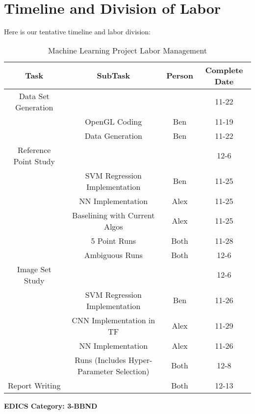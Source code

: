 \documentclass[journal]{IEEEtran}
\begin{document}
\section{Timeline and Division of Labor}

Here is our tentative timeline and labor division:

\begin{table}
\caption{Machine Learning Project Labor Management}
\label{SomeTable}
\centering
\begin{tabular}{|c|c|c|c|}
\hline
Task & SubTask & Person & Complete Date\\
\hline
Data Set Generation &  & & 11-22\\
& OpenGL Coding & Ben & 11-19\\
& Data Generation & Ben & 11-22\\
Reference Point Study & & & 12-6\\
& SVM Regression Implementation & Ben & 11-25\\
& NN Implementation & Alex & 11-25\\
& Baselining with Current Algos & Alex & 11-25\\
& 5 Point Runs & Both & 11-28\\
& Ambiguous Runs & Both & 12-6\\
Image Set Study & & & 12-6\\
& SVM Regression Implementation & Ben & 11-26\\
& CNN Implementation in TF & Alex & 11-29\\
& NN Implementation & Alex & 11-26\\
& Runs (Includes Hyper-Parameter Selection) & Both & 12-8\\
Report Writing & & Both & 12-13\\
\hline


\end{tabular}
\end{table}


 \ifCLASSOPTIONpeerreview
 \begin{center} \bfseries EDICS Category: 3-BBND \end{center}
 \fi



\IEEEpeerreviewmaketitle




   
\end{document}

